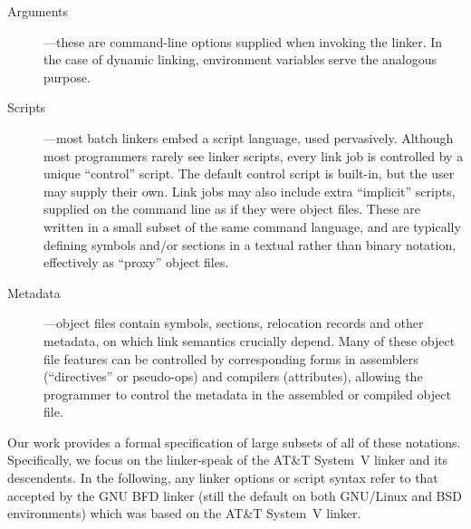 \begin{description}

\item[Arguments] ---these are command-line options supplied when invoking the linker.
In the case of dynamic linking, environment variables serve the analogous purpose.

\item[Scripts] ---most batch linkers embed a script language, used pervasively.
Although most programmers rarely see linker scripts, every link job is controlled by a unique ``control'' script.
The default control script is built-in, but the user may supply their own.
Link jobs may also include extra ``implicit'' scripts, supplied on the command line as if they were object files.
These are written in a small subset of the same command language, and are typically 
defining symbols and/or sections in a textual rather than binary notation, effectively
as ``proxy'' object files.

\item[Metadata] ---object files contain symbols, sections, relocation records
and other metadata, on which link semantics crucially depend. Many of these 
object file features can be controlled by corresponding forms in assemblers 
(``directives'' or pseudo-ops) and compilers (attributes), allowing the programmer
to control the metadata in the assembled or compiled object file.

\end{description}

Our work provides a formal specification
of large subsets of all of these notations.
Specifically, we focus on the linker-speak of the AT\&T System~V linker
and its descendents. 
In the following, any linker options or script syntax
refer to that accepted by the GNU BFD linker
(still the default on both GNU/Linux and BSD environments)
which was based on the AT\&T System~V linker.



